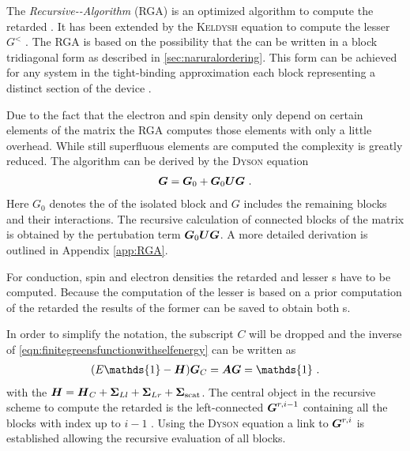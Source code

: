 \label{sec:rgapresentation}
The \emph{Recursive-\gfnc-Algorithm} (RGA) \cite{MacKinnon1985} is an optimized algorithm to compute the retarded \gfnc{}. It has been extended by the \textsc{Keldysh} equation to compute the lesser \gfnc{} $G^<$ \cite{JApplPhys.91.2343}.
The RGA is based on the possibility that the \hamil{} can be written in a block tridiagonal form as described in \cref{sec:naruralordering}.
This form can be achieved for any system in the tight-binding approximation  each block representing a distinct section of the device \cite{Wimmer2009Thesis}.\par
Due to the fact that the electron and spin density only depend on certain elements of the \gfnc{} matrix the RGA computes those elements with only a little overhead. While still superfluous elements are computed the complexity is greatly reduced. The algorithm can be derived by the \textsc{Dyson} equation
\begin{align}
	\boldsymbol{G} = \boldsymbol{G}_0+\boldsymbol{G}_0\boldsymbol{U}\boldsymbol{G}\ .
	\label{eqn:DysonEquationG}
\end{align}
Here $G_0$ denotes the \gfnc{} of the isolated block and $G$ includes the remaining blocks and their interactions. The recursive calculation of connected blocks of the \gfnc{} matrix is obtained by the pertubation term $\boldsymbol{G}_0\boldsymbol{U}\boldsymbol{G}$. A more detailed derivation is outlined in Appendix \ref{app:RGA}.\par
For conduction, spin and electron densities the retarded and lesser \gfnc s have to be computed. Because the computation of the lesser \gfnc{} is based on a prior computation of the retarded \gfnc{} the results of the former can be saved to obtain both \gfnc s.\par
In order to simplify the notation, the subscript $C$ will be dropped and the inverse of \cref{eqn:finitegreensfunctionwithselfenergy} can be written as
\begin{align}
(E\mathds{1}-\mat{H})\mat{G}_C = \mat{A}\mat{G}=\mathds{1}\ .
\label{eqn:amatrix}
\end{align}
with the \hamil{} $\boldsymbol{H}=\boldsymbol{H}_C +\boldsymbol{\Sigma}_{Ll}+\boldsymbol{\Sigma}_{Lr}+\boldsymbol{\Sigma}_{\text{scat}} $.
The central object in the recursive scheme to compute the retarded \gfnc{} is the left-connected \gfnc{} $\boldsymbol{G}^{r,i-1}$ containing all the blocks with index up to $i-1$ \cite{JApplPhys.91.2343}. Using the \textsc{Dyson} equation a link to $\boldsymbol{G}^{r,i}$ is established allowing the recursive evaluation of all blocks.\par
